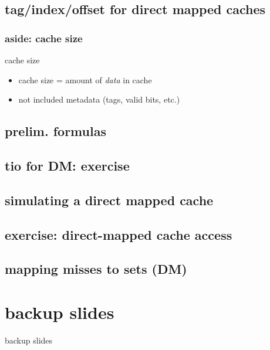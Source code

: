 \subsection{tag/index/offset for direct mapped caches}


\subsubsection{aside: cache size}
\begin{frame}{cache size}
    \begin{itemize}
    \item cache size = amount of \textit{data} in cache
    \item not included metadata (tags, valid bits, etc.)
    \end{itemize}
\end{frame}

\subsection{prelim. formulas}


\subsection{tio for DM: exercise}


\subsection{simulating a direct mapped cache}


\subsection{exercise: direct-mapped cache access}


\subsection{mapping misses to sets (DM)}


\section{backup slides}
\begin{frame}{backup slides}
\end{frame}


